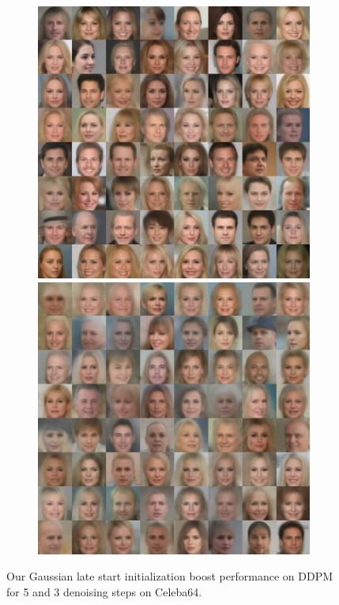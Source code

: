 \begin{figure}
\begin{subfigure}{0.495\textwidth}
  \end{subfigure}
  \begin{subfigure}{0.495\textwidth}
    \includegraphics[width=\linewidth]{figs/imgs/ddpm_ddpm_celeba64_data_samples_T_800_5_steps.jpg}
    \includegraphics[width=\linewidth]{figs/imgs/ddpm_ddpm_celeba64_data_samples_T_700_3_steps.jpg}
  \end{subfigure}
  \caption{Our Gaussian late start initialization boost performance on DDPM for 5 and 3 denoising steps on Celeba64.}
  \label{fig:glsddpm_celeba64_big}
\end{figure}


